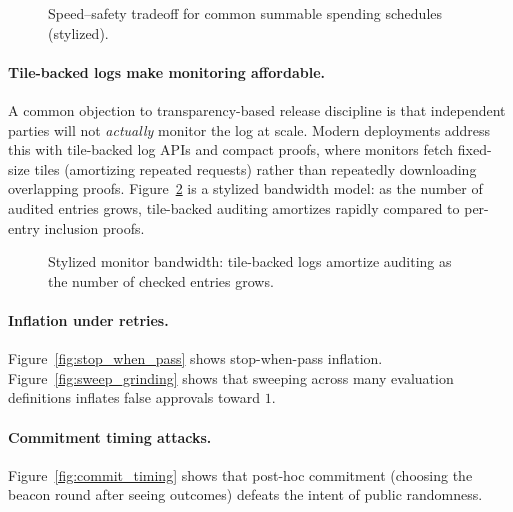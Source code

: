 \documentclass[11pt]{article}
\begin{document}
\begin{figure}[t]
\centering
{}
\caption{Speed--safety tradeoff for common summable spending schedules (stylized).}
\label{fig:tradeoff}
\end{figure}

\paragraph{Tile-backed logs make monitoring affordable.}
A common objection to transparency-based release discipline is that independent parties will not \emph{actually} monitor the log at scale.
Modern deployments address this with tile-backed log APIs and compact proofs, where monitors fetch fixed-size tiles (amortizing repeated requests) rather than repeatedly downloading overlapping proofs. \cite{c2sp_tlog_tiles,static_ct_api_spec,tesseract_blog_2025,cloudflare_azul_ct_2025}
Figure~\ref{fig:tile_cost} is a stylized bandwidth model: as the number of audited entries grows, tile-backed auditing amortizes rapidly compared to per-entry inclusion proofs.

\begin{figure}[t]
\centering
{}
\caption{Stylized monitor bandwidth: tile-backed logs amortize auditing as the number of checked entries grows.}
\label{fig:tile_cost}
\end{figure}


\paragraph{Inflation under retries.}
Figure~\ref{fig:stop_when_pass} shows stop-when-pass inflation.
Figure~\ref{fig:sweep_grinding} shows that sweeping across many evaluation definitions inflates false approvals toward $1$.

\paragraph{Commitment timing attacks.}
Figure~\ref{fig:commit_timing} shows that post-hoc commitment (choosing the beacon round after seeing outcomes) defeats the intent of public randomness.
\end{document}
